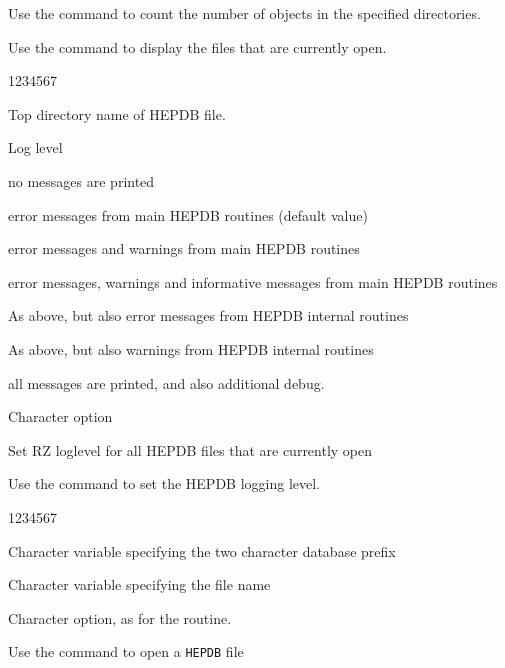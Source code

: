Use the  command to count the number of objects in the specified
directories.


Use the  command to display the files that are currently
open.


\begin{DLtt}{1234567}
\item[PATH]Top directory name of HEPDB file.
\item[LOGLEV]Log level
  \begin{DLtt}{12}
    \item[<0]no messages are printed
    \item[\ 1]error messages from main HEPDB routines (default value)
    \item[\ 2]error messages and warnings from main HEPDB routines
    \item[\ 3]error messages, warnings and informative messages from
      main HEPDB routines
    \item[\ 4]As above, but also error messages from HEPDB internal routines
    \item[\ 5]As above, but also warnings from HEPDB internal routines
    \item[>5]all messages are printed, and also additional debug.
  \end{DLtt}
\item[CHOPT]Character option
  \begin{DLtt}{1}
    \item[A]Set RZ loglevel for all HEPDB files that are currently open
  \end{DLtt}
\end{DLtt}

Use the  command to set the HEPDB logging level.


\begin{DLtt}{1234567}
\item[PREFIX]Character variable specifying the two character database prefix
\item[CHFILE]Character variable specifying the file name
\item[CHOPT]Character option, as for the  routine.
\end{DLtt}

Use the  command to open a {\tt HEPDB} file

